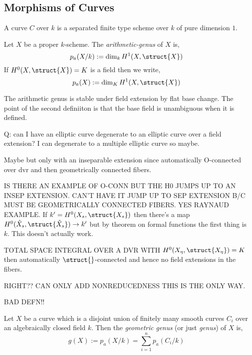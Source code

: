 \documentclass[12pt]{article}
\begin{document}
\subsection{Morphisms of Curves}


\begin{defn}
A curve $C$ over $k$ is a separated finite type scheme over $k$ of pure dimension $1$.
\end{defn}

\begin{prop}

\end{prop}

\begin{defn}
Let $X$ be a proper $k$-scheme. The \textit{arithmetic-genus} of $X$ is,
\[ p_a(X/k) := \dim_k H^1(X, \struct{X}) \]
If $H^0(X, \struct{X}) = K$ is a field then we write,
\[ p_a(X) := \dim_K H^1(X, \struct{X}) \]
\end{defn}

\begin{rmk}
The arithmetic genus is stable under field extension by flat base change.
The point of the second definiiton is that the base field is unambiguous when it is defined.
\end{rmk}

Q: can I have an elliptic curve degenerate to an elliptic curve over a field extension? I can degenerate to a multiple elliptic curve so maybe.

Maybe but only with an inseparable extension since automatically O-connected over dvr and then geometrically connected fibers. 

IS THERE AN EXAMPLE OF O-CONN BUT THE H0 JUMPS UP TO AN INSEP EXTENSION. CAN'T HAVE IT JUMP UP TO SEP EXTENSION B/C MUST BE GEOMETRICALLY CONNECTED FIBERS. YES RAYNAUD EXAMPLE. If $k' = H^0(X_s, \struct{X_s})$ then there's a map $H^0(\hat{X}_s, \struct{\hat{X}_s}) \to k'$ but by theorem on formal functions the first thing is $k$. This doesn't actually work. 

TOTAL SPACE INTEGRAL OVER A DVR WITH $H^0(X_\eta, \struct{X_{\eta}}) = K$ then automatically $\struct{}$-connected and hence no field extensions in the fibers.

RIGHT?? CAN ONLY ADD NONREDUCEDNESS THIS IS THE ONLY WAY.


BAD DEFN!!
\begin{defn}
Let $X$ be a curve which is a disjoint union of finitely many smooth curves $C_i$ over an algebraically closed field $k$. Then the \textit{geometric genus} (or just \textit{genus}) of $X$ is,
\[ g(X) :=  p_a(X/k) = \sum_{i = 1}^n p_a(C_i/k) \]
\end{defn}
\end{document}
